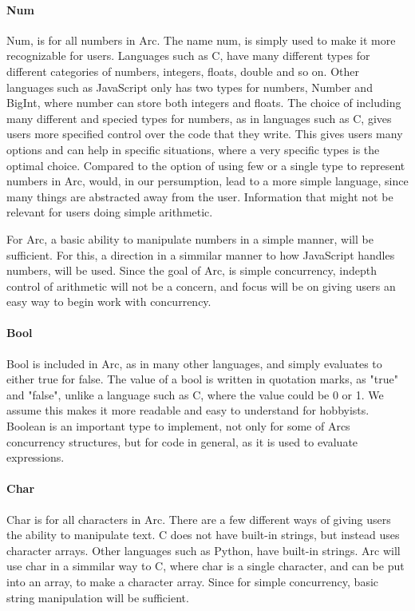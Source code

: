 \paragraph*{Num}
Num, is for all numbers in Arc. The name num, is simply used to make it more recognizable for users. Languages such as C, have many different types for different categories of numbers, integers, floats, double and so on. Other languages such as JavaScript only has two types for numbers, Number and BigInt, where number can store both integers and floats.
The choice of including many different and specied types for numbers, as in languages such as C, gives users more specified control over the code that they write. This gives users many options and can help in specific situations, where a very specific types is the optimal choice.
Compared to the option of using few or a single type to represent numbers in Arc, would, in our persumption, lead to a more simple language, since many things are abstracted away from the user. Information that might not be relevant for users doing simple arithmetic.

For Arc, a basic ability to manipulate numbers in a simple manner, will be sufficient. For this, a direction in a simmilar manner to how JavaScript handles numbers, will be used. Since the goal of Arc, is simple concurrency, indepth control of arithmetic will not be a concern, and focus will be on giving users an easy way to begin work with concurrency.

\paragraph*{Bool}
Bool is included in Arc, as in many other languages, and simply evaluates to either true for false. The value of a bool is written in quotation marks, as "true" and "false", unlike a language such as C, where the value could be 0 or 1. We assume this makes it more readable and easy to understand for hobbyists. Boolean is an important type to implement, not only for some of Arcs concurrency structures, but for code in general, as it is used to evaluate expressions. 

\paragraph*{Char}
Char is for all characters in Arc. There are a few different ways of giving users the ability to manipulate text. C does not have built-in strings, but instead uses character arrays. Other languages such as Python, have built-in strings. Arc will use char in a simmilar way to C, where char is a single character, and can be put into an array, to make a character array. Since for simple concurrency, basic string manipulation will be sufficient.


